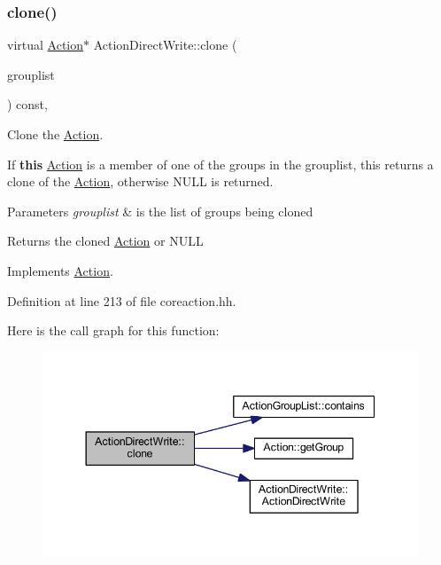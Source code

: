 \subsubsection{\texorpdfstring{clone()}{clone()}}
{\footnotesize\ttfamily virtual \mbox{\hyperlink{class_action}{Action}}$\ast$ Action\+Direct\+Write\+::clone (\begin{DoxyParamCaption}\item[{const \mbox{\hyperlink{class_action_group_list}{Action\+Group\+List}} \&}]{grouplist }\end{DoxyParamCaption}) const\hspace{0.3cm}{\ttfamily [inline]}, {\ttfamily [virtual]}}



Clone the \mbox{\hyperlink{class_action}{Action}}. 

If {\bfseries{this}} \mbox{\hyperlink{class_action}{Action}} is a member of one of the groups in the grouplist, this returns a clone of the \mbox{\hyperlink{class_action}{Action}}, otherwise N\+U\+LL is returned. 
\begin{DoxyParams}{Parameters}
{\em grouplist} & is the list of groups being cloned \\
\hline
\end{DoxyParams}
\begin{DoxyReturn}{Returns}
the cloned \mbox{\hyperlink{class_action}{Action}} or N\+U\+LL 
\end{DoxyReturn}


Implements \mbox{\hyperlink{class_action_af8242e41d09e5df52f97df9e65cc626f}{Action}}.



Definition at line 213 of file coreaction.\+hh.

Here is the call graph for this function\+:
\nopagebreak
\begin{figure}[H]
\begin{center}
\leavevmode
\includegraphics[width=344pt]{class_action_direct_write_adbb35f944b5ae30faf45797be1c6965d_cgraph}
\end{center}
\end{figure}



